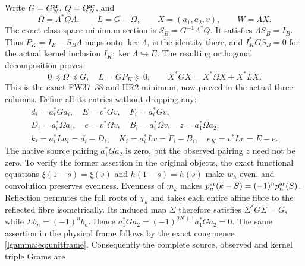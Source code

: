 Write $G=G_N^{\rm ar}$, $Q=Q_N^{\rm ar}$, and
\begin{equation}\label{lgamma:eq:omegal}
 \Omega=\Lambda^*Q\Lambda,\qquad L=G-\Omega,\qquad
 X=(a_1,a_2,v),\qquad W=\Lambda X.
\end{equation}
The exact class-space minimum section is
$S_B=G^{-1}\Lambda^*Q$.  It satisfies $\Lambda S_B=I_B$.
Thus $P_K=I_E-S_B\Lambda$ maps onto $\ker\Lambda$, is the identity
there, and $I_K^*GS_B=0$ for the actual kernel inclusion
$I_K:\ker\Lambda\hookrightarrow E$.
The resulting orthogonal decomposition proves
\begin{equation}\label{lgamma:eq:split}
 0\preceq\Omega\preceq G,\quad L=GP_K\succeq0,
 \qquad X^*GX=X^*\Omega X+X^*LX.
\end{equation}
This is the exact FW37--38 and HR2 minimum, now proved in the actual
three columns.  Define all its entries without dropping any:
\begin{equation}\label{lgamma:eq:entries}
 \begin{gathered}
 d_i=a_i^*Ga_i,\quad E=v^*Gv,\quad F_i=a_i^*Gv,\\
 D_i=a_i^*\Omega a_i,\quad e=v^*\Omega v,\quad
 B_i=a_i^*\Omega v,\quad z=a_1^*\Omega a_2,\\
 k_i=a_i^*La_i=d_i-D_i,\quad
 K_i=a_i^*Lv=F_i-B_i,\quad e_K=v^*Lv=E-e.
 \end{gathered}
\end{equation}
The native source pairing $a_1^*Ga_2$ is zero, but the observed pairing
$z$ need not be zero.  To verify the former assertion in the original
objects, the exact functional equations $\xi(1-s)=\xi(s)$ and
$h(1-s)=h(s)$ make $w_h$ even, and convolution preserves evenness.
Evenness of $m_k$ makes $p_n^{\rm ar}(k-S)=(-1)^np_n^{\rm ar}(S)$.
Reflection permutes the full roots of $\chi_k$ and takes each entire
affine fibre to the reflected fibre isometrically.  Its induced map
$\Sigma$ therefore satisfies $\Sigma^*G\Sigma=G$, while
$\Sigma b_n=(-1)^nb_n$.  Hence
$a_1^*Ga_2=(-1)^{2N+1}a_1^*Ga_2=0$.  The same assertion in the
physical frame follows by the exact congruence \eqref{lgamma:eq:unitframe}.
Consequently the complete source, observed and kernel triple Grams are
